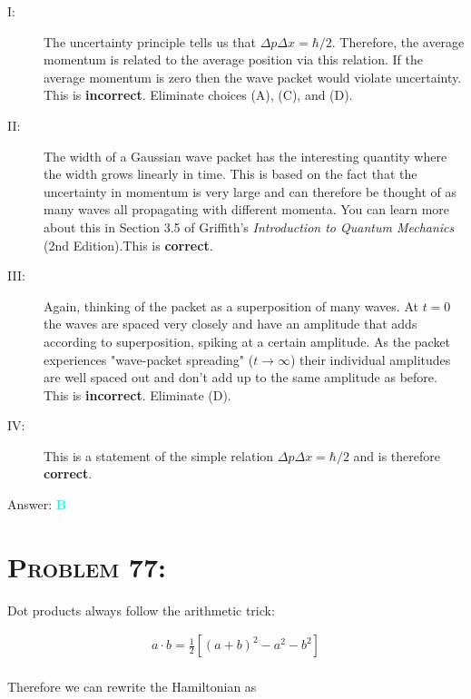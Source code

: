 \documentclass{article}
\begin{document}
\begin{description}

\item[I:] The uncertainty principle tells us that $\Delta p \Delta x = \hbar / 2$. Therefore, the average momentum is related to the average position via this relation. If the average momentum is zero then the wave packet would violate uncertainty. This is \textbf{incorrect}. Eliminate choices (A), (C), and (D).

\item[II:] The width of a Gaussian wave packet has the interesting quantity where the width grows linearly in time. This is based on the fact that the uncertainty in momentum is very large and can therefore be thought of as many waves all propagating with different momenta. You can learn more about this in Section 3.5 of Griffith's \textit{Introduction to Quantum Mechanics} (2nd Edition).This is \textbf{correct}.

\item[III:] Again, thinking of the packet as a superposition of many waves. At $t=0$ the waves are spaced very closely and have an amplitude that adds according to superposition, spiking at a certain amplitude. As the packet experiences "wave-packet spreading" ($t \rightarrow \infty$) their individual amplitudes are well spaced out and don't add up to the same amplitude as before. This is \textbf{incorrect}. Eliminate (D).

\item[IV:] This is a statement of the simple relation $\Delta p \Delta x = \hbar / 2$ and is therefore \textbf{correct}. 
\\

\end{description}
Answer: \textbf{\textcolor{cyan}B}\\


\section{\textsc{Problem 77:}} Dot products always follow the arithmetic trick:

\begin{gather}
a \cdot b = \frac{1}{2} \left[   (a + b)^{2} - a^{2} - b^{2}  \right]
\end{gather}
\\
Therefore we can rewrite the Hamiltonian as 
\end{document}
